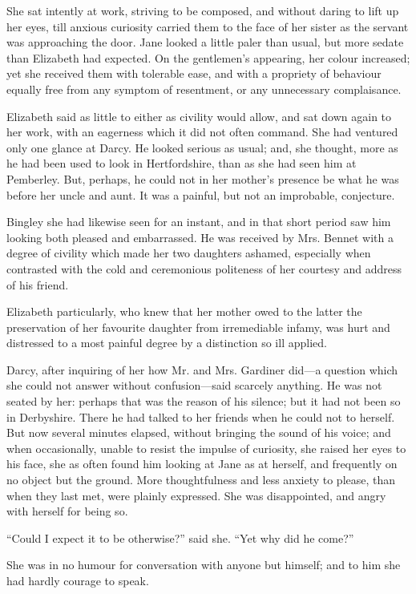 \documentclass[12pt,openright]{book}
\begin{document}
She sat intently at work, striving to be composed, and without daring to lift up her eyes, till anxious curiosity carried them to the face of her sister as the servant was approaching the door. Jane looked a little paler than usual, but more sedate than Elizabeth had expected. On the gentlemen’s appearing, her colour increased; yet she received them with tolerable ease, and with a propriety of behaviour equally free from any symptom of resentment, or any unnecessary complaisance.

Elizabeth said as little to either as civility would allow, and sat down again to her work, with an eagerness which it did not often command. She had ventured only one glance at Darcy. He looked serious as usual; and, she thought, more as he had been used to look in Hertfordshire, than as she had seen him at Pemberley. But, perhaps, he could not in her mother’s presence be what he was before her uncle and aunt. It was a painful, but not an improbable, conjecture.

Bingley she had likewise seen for an instant, and in that short period saw him looking both pleased and embarrassed. He was received by Mrs. Bennet with a degree of civility which made her two daughters ashamed, especially when contrasted with the cold and ceremonious politeness of her courtesy and address of his friend.

Elizabeth particularly, who knew that her mother owed to the latter the preservation of her favourite daughter from irremediable infamy, was hurt and distressed to a most painful degree by a distinction so ill applied.

Darcy, after inquiring of her how Mr. and Mrs. Gardiner did—a question which she could not answer without confusion—said scarcely anything. He was not seated by her: perhaps that was the reason of his silence; but it had not been so in Derbyshire. There he had talked to her friends when he could not to herself. But now several minutes elapsed, without bringing the sound of his voice; and when occasionally, unable to resist the impulse of curiosity, she raised her eyes to his face, she as often found him looking at Jane as at herself, and frequently on no object but the ground. More thoughtfulness and less anxiety to please, than when they last met, were plainly expressed. She was disappointed, and angry with herself for being so.

“Could I expect it to be otherwise?” said she. “Yet why did he come?”

She was in no humour for conversation with anyone but himself; and to him she had hardly courage to speak.
\end{document}
